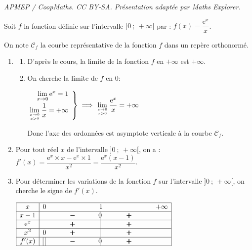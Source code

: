 \documentclass[10pt]{article}
\providecommand{\e}{{\mathrm{e}}}
\providecommand{\ds}{\displaystyle}
\begin{document}
\noindent\textit{APMEP / CoopMaths. CC BY-SA. Présentation adaptée par Maths Explorer.}\par\medskip
\medskip

Soit $f$ la fonction définie sur l'intervalle $]0~;~ +\infty[$ par :
$f(x) = \dfrac{\e^x}{x}$.

On note $\mathcal{C}_f$ la courbe représentative de la fonction $f$ dans un repère orthonormé. 



\begin{enumerate}
\item 
	\begin{enumerate}
		\item D'après le cours, la limite de la fonction $f$ en $+ \infty$ est $+\infty$.
		
		\item On cherche la limite de $f$ en 0:
		
$\left.
\begin{array}{@{} r}
\ds\lim_{x\to 0} \e^{x} = 1\\[7pt]
\ds\lim_{x\to 0\atop x>0} \dfrac{1}{x}= +\infty
\end{array}
\right \rbrace
\implies
\ds\lim_{x\to 0 \atop x>0} \dfrac{\e^{x}}{x}  = +\infty$		
		
Donc l'axe des ordonnées est asymptote verticale à la courbe $\mathcal{C}_f$.
	\end{enumerate}
\item Pour tout réel $x$ de l'intervalle $]0~;~ +\infty[$, on a :
$f'(x)=\dfrac{\e^{x}\times x - \e^{x}\times 1}{x^2} = \dfrac{\e^{x} (x-1)}{x^2}$.

\item Pour déterminer les variations de la fonction $f$ sur l'intervalle $]0~;~ +\infty[$, on cherche le signe de $f'(x)$.

\begin{center}
{\renewcommand{\arraystretch}{1.5}
\def\esp{\hspace*{2cm}}
$\begin{array}{|c | *{5}{c} |} 
\hline
x  & 0 & \esp & 1 & \esp  & +\infty \\
\hline
x-1 &  & \pmb{-} &  \vline\hspace{-2.7pt}{0} & \pmb{+} &   \\
\hline
\e^{x} &  & \pmb{+} &  \vline\hspace{-2.7pt}{\phantom 0} & \pmb{+} &   \\
\hline
x^2 & 0 \hfill{} & \pmb{+} &  \vline\hspace{-2.7pt}{\phantom 0} & \pmb{+} &   \\
\hline
f'(x) &  \vline\;\vline\hfill{} & \pmb{-} &  \vline\hspace{-2.7pt}{0} & \pmb{+} &   \\
\hline
\end{array}$
}
\end{center}


\end{enumerate}
\end{document}

